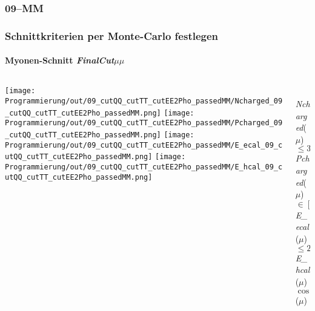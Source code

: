 \documentclass{beamer}
\begin{document}
\subsubsection{09--MM}
\begin{frame}
	\frametitle{Schnittkriterien per Monte-Carlo festlegen}
	\framesubtitle{Myonen-Schnitt \textit{FinalCut$\mu\mu$}}
	\begin{columns}
		\begin{column}{0.95\textwidth}
			\texttt{[image: Programmierung/out/09\_cutQQ\_cutTT\_cutEE2Pho\_passedMM/Ncharged\_09\_cutQQ\_cutTT\_cutEE2Pho\_passedMM.png]}
			\texttt{[image: Programmierung/out/09\_cutQQ\_cutTT\_cutEE2Pho\_passedMM/Pcharged\_09\_cutQQ\_cutTT\_cutEE2Pho\_passedMM.png]}
			\newline
			\texttt{[image: Programmierung/out/09\_cutQQ\_cutTT\_cutEE2Pho\_passedMM/E\_ecal\_09\_cutQQ\_cutTT\_cutEE2Pho\_passedMM.png]}
			\texttt{[image: Programmierung/out/09\_cutQQ\_cutTT\_cutEE2Pho\_passedMM/E\_hcal\_09\_cutQQ\_cutTT\_cutEE2Pho\_passedMM.png]}
		\end{column}
		\begin{column}{0.2\textwidth}
			\\
			{\color{blue}\textit{Ncharged}($\mu$)}\newline
					$\leq 3$\\
			{\color{blue}\textit{Pcharged}($\mu$)}\newline
					$\in [2.0, 77.0]$\\
			{\color[rgb]{0.6,0.6,0}\textit{E\_ecal}($\mu$)}\newline
					$\leq 25.0$\\
			{\color[rgb]{1,0,1}\textit{E\_hcal}($\mu$)}\newline
					\\
			$\cos\_thet$($\mu$)\newline
					\\
			\\
			\\
			\\
			\\
		\end{column}
	\end{columns}
\end{frame}
\end{document}
